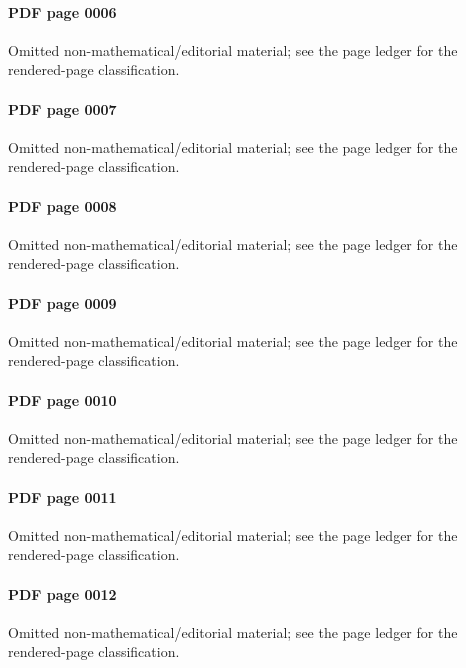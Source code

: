 \paragraph{PDF page 0006}\uses{}\label{mcrt-omitted-p0006} Omitted non-mathematical/editorial material; see the page ledger for the rendered-page classification.\par
\paragraph{PDF page 0007}\uses{}\label{mcrt-omitted-p0007} Omitted non-mathematical/editorial material; see the page ledger for the rendered-page classification.\par
\paragraph{PDF page 0008}\uses{}\label{mcrt-omitted-p0008} Omitted non-mathematical/editorial material; see the page ledger for the rendered-page classification.\par
\paragraph{PDF page 0009}\uses{}\label{mcrt-omitted-p0009} Omitted non-mathematical/editorial material; see the page ledger for the rendered-page classification.\par
\paragraph{PDF page 0010}\uses{}\label{mcrt-omitted-p0010} Omitted non-mathematical/editorial material; see the page ledger for the rendered-page classification.\par
\paragraph{PDF page 0011}\uses{}\label{mcrt-omitted-p0011} Omitted non-mathematical/editorial material; see the page ledger for the rendered-page classification.\par
\paragraph{PDF page 0012}\uses{}\label{mcrt-omitted-p0012} Omitted non-mathematical/editorial material; see the page ledger for the rendered-page classification.\par
